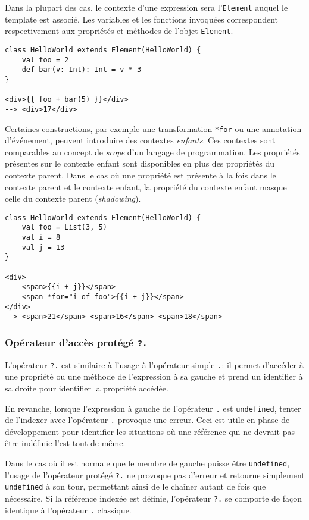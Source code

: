 Dans la plupart des cas, le contexte d'une expression sera l'\texttt{Element} auquel le template est associé. Les variables et les fonctions invoquées correspondent respectivement aux propriétés et méthodes de l'objet \texttt{Element}.

\begin{lstlisting}
class HelloWorld extends Element(HelloWorld) {
	val foo = 2
	def bar(v: Int): Int = v * 3
}

<div>{{ foo + bar(5) }}</div>
--> <div>17</div>
\end{lstlisting}

Certaines constructions, par exemple une transformation \texttt{*for} ou une annotation d'événement, peuvent introduire des contextes \emph{enfants}. Ces contextes sont comparables au concept de \emph{scope} d'un langage de programmation. Les propriétés présentes sur le contexte enfant sont disponibles en plus des propriétés du contexte parent. Dans le cas où une propriété est présente à la fois dans le contexte parent et le contexte enfant, la propriété du contexte enfant masque celle du contexte parent (\emph{shadowing}).

\begin{lstlisting}
class HelloWorld extends Element(HelloWorld) {
	val foo = List(3, 5)
	val i = 8
	val j = 13
}

<div>
	<span>{{i + j}}</span>
	<span *for="i of foo">{{i + j}}</span>
</div>
--> <span>21</span> <span>16</span> <span>18</span>
\end{lstlisting}

\subsubsection{Opérateur d'accès protégé \texttt{?.}}
L'opérateur \texttt{?.} est similaire à l'usage à l'opérateur simple \texttt{.}: il permet d'accéder à une propriété ou une méthode de l'expression à sa gauche et prend un identifier à sa droite pour identifier la propriété accédée.

En revanche, lorsque l'expression à gauche de l'opérateur \texttt{.} est \texttt{undefined}, tenter de l'indexer avec l'opérateur \texttt{.} provoque une erreur. Ceci est utile en phase de développement pour identifier les situations où une référence qui ne devrait pas être indéfinie l'est tout de même.

Dans le cas où il est normale que le membre de gauche puisse être \texttt{undefined}, l'usage de l'opérateur protégé \texttt{?.} ne provoque pas d'erreur et retourne simplement \texttt{undefined} à son tour, permettant ainsi de le chaîner autant de fois que nécessaire. Si la référence indexée est définie, l'opérateur \texttt{?.} se comporte de façon identique à l'opérateur \texttt{.} classique.

